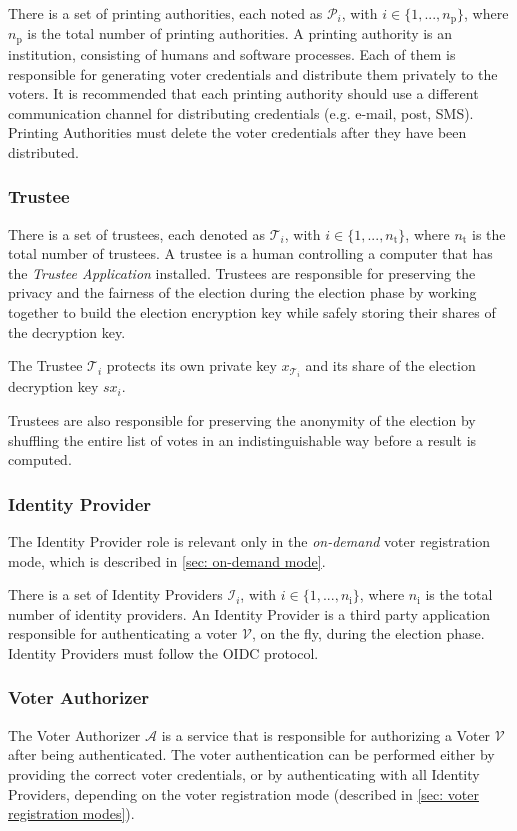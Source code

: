 There is a set of printing authorities, each noted as $\mathcal{P}_i$, with \( i \in \{ 1, ..., n_\mathrm{p} \} \), where $n_\mathrm{p}$ is the total number of printing authorities. A printing authority is an institution, consisting of humans and software processes. Each of them is responsible for generating voter credentials and distribute them privately to the voters. It is recommended that each printing authority should use a different communication channel for distributing credentials (e.g. e-mail, post, SMS). Printing Authorities must delete the voter credentials after they have been distributed.


\subsubsection{Trustee}
There is a set of trustees, each denoted as $\mathcal{T}_i$, with \( i \in \{ 1, ..., n_\mathrm{t} \} \), where $n_\mathrm{t}$ is the total number of trustees. A trustee is a human controlling a computer that has the \textit{Trustee Application} installed. Trustees are responsible for preserving the privacy and the fairness of the election during the election phase by working together to build the election encryption key while safely storing their shares of the decryption key.

The Trustee $\mathcal{T}_i$ protects its own private key $x_{\mathcal{T}_i}$ and its share of the election decryption key $sx_i$.

Trustees are also responsible for preserving the anonymity of the election by shuffling the entire list of votes in an indistinguishable way before a result is computed.


\subsubsection{Identity Provider}
The Identity Provider role is relevant only in the \textit{on-demand} voter registration mode, which is described in \cref{sec: on-demand mode}.
    
There is a set of Identity Providers $\mathcal{I}_i$, with $i \in \{ 1, ..., n_\mathrm{i} \}$, where $n_\mathrm{i}$ is the total number of identity providers. An Identity Provider is a third party application responsible for authenticating a voter $\mathcal{V}$, on the fly, during the election phase. Identity Providers must follow the OIDC protocol.


\subsubsection{Voter Authorizer} 
The Voter Authorizer $\mathcal{A}$ is a service that is responsible for authorizing a Voter $\mathcal{V}$ after being authenticated. The voter authentication can be performed either by providing the correct voter credentials, or by authenticating with all Identity Providers, depending on the voter registration mode (described in \cref{sec: voter registration modes}).


